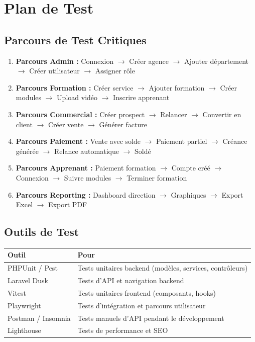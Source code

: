\documentclass[12pt,a4paper]{report}
\begin{document}
\chapter{Plan de Test}

\section{Parcours de Test Critiques}

\begin{enumerate}
    \item \textbf{Parcours Admin :} Connexion $\rightarrow$ Créer agence $\rightarrow$ Ajouter département $\rightarrow$ Créer utilisateur $\rightarrow$ Assigner rôle
    \item \textbf{Parcours Formation :} Créer service $\rightarrow$ Ajouter formation $\rightarrow$ Créer modules $\rightarrow$ Upload vidéo $\rightarrow$ Inscrire apprenant
    \item \textbf{Parcours Commercial :} Créer prospect $\rightarrow$ Relancer $\rightarrow$ Convertir en client $\rightarrow$ Créer vente $\rightarrow$ Générer facture
    \item \textbf{Parcours Paiement :} Vente avec solde $\rightarrow$ Paiement partiel $\rightarrow$ Créance générée $\rightarrow$ Relance automatique $\rightarrow$ Soldé
    \item \textbf{Parcours Apprenant :} Paiement formation $\rightarrow$ Compte créé $\rightarrow$ Connexion $\rightarrow$ Suivre modules $\rightarrow$ Terminer formation
    \item \textbf{Parcours Reporting :} Dashboard direction $\rightarrow$ Graphiques $\rightarrow$ Export Excel $\rightarrow$ Export PDF
\end{enumerate}

\section{Outils de Test}

\begin{tabularx}{\textwidth}{l X}
    \toprule
    \textbf{Outil} & \textbf{Pour} \\
    \midrule
    PHPUnit / Pest & Tests unitaires backend (modèles, services, contrôleurs) \\
    Laravel Dusk & Tests d'API et navigation backend \\
    Vitest & Tests unitaires frontend (composants, hooks) \\
    Playwright & Tests d'intégration et parcours utilisateur \\
    Postman / Insomnia & Tests manuels d'API pendant le développement \\
    Lighthouse & Tests de performance et SEO \\
    \bottomrule
\end{tabularx}
\end{document}
